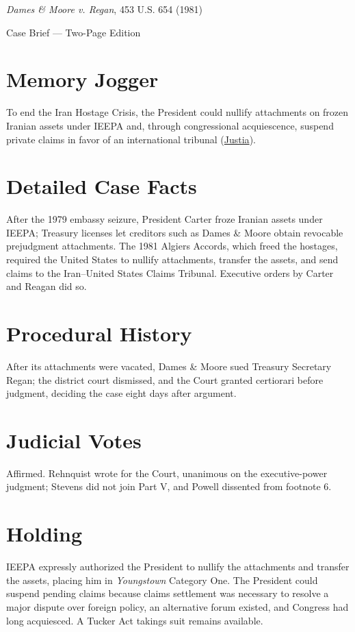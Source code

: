 \documentclass[12pt]{article}
\begin{document}
\begin{center}
{\LARGE \textit{Dames \& Moore v. Regan}, 453 U.S. 654 (1981)\par}
\vspace{0.5em}
{\large Case Brief --- Two-Page Edition\par}
\end{center}

\section{Memory Jogger}
To end the Iran Hostage Crisis, the President could nullify attachments on frozen Iranian assets under IEEPA and, through congressional acquiescence, suspend private claims in favor of an international tribunal (\href{https://supreme.justia.com/cases/federal/us/453/654/}{Justia}).

\section{Detailed Case Facts}
After the 1979 embassy seizure, President Carter froze Iranian assets under IEEPA; Treasury licenses let creditors such as Dames \& Moore obtain revocable prejudgment attachments. The 1981 Algiers Accords, which freed the hostages, required the United States to nullify attachments, transfer the assets, and send claims to the Iran--United States Claims Tribunal. Executive orders by Carter and Reagan did so.

\section{Procedural History}
After its attachments were vacated, Dames \& Moore sued Treasury Secretary Regan; the district court dismissed, and the Court granted certiorari before judgment, deciding the case eight days after argument.

\section{Judicial Votes}
Affirmed. Rehnquist wrote for the Court, unanimous on the executive-power judgment; Stevens did not join Part V, and Powell dissented from footnote 6.

\section{Holding}
IEEPA expressly authorized the President to nullify the attachments and transfer the assets, placing him in \textit{Youngstown} Category One. The President could suspend pending claims because claims settlement was necessary to resolve a major dispute over foreign policy, an alternative forum existed, and Congress had long acquiesced. A Tucker Act takings suit remains available.
\end{document}
